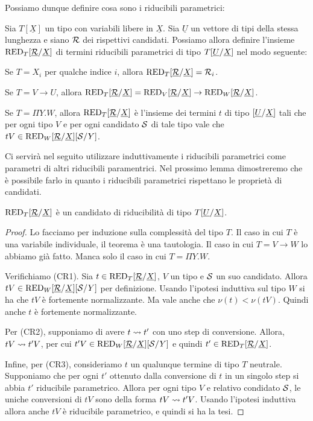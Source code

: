 \documentclass[]{marticle}
\begin{document}
Possiamo dunque definire cosa sono i riducibili parametrici:
\newcommand{\subrx}{\sub{\underline{\can{R}}}{\underline{X}}}
\begin{block} [Definizione]
    Sia $T[\underline{X}]$ un tipo con variabili libere in $\underline{X}$. Sia
    $\underline{U}$ un vettore di tipi della stessa lunghezza e siano $\mathcal{R}$
    dei rispettivi candidati. Possiamo allora definire l'insieme
    $\red{T}\subrx$ di termini riducibili parametrici di tipo
    $T[\underline{U}/\underline{X}]$ nel modo seguente:
    \begin{nlist} [1]
        \item  Se $T=X_i$ per qualche indice $i$, allora
            $\red{T}\subrx=\can{R}_i$.
        \item Se $T=V\rightarrow U$, allora $\red{T}\subrx = \red{V}\subrx
            \rightarrow \red{W}\subrx$.
        \item Se $T=\Pi Y.W$, allora $\red{T}\subrx$ \`e l'insieme dei termini
            $t$ di tipo $[\underline{U}/\underline{X}]$ tali che per ogni
            tipo $V$ e per ogni candidato $\mathcal{S}$ di tale tipo vale che $tV
            \in \red{W}\subrx\sub{\can{S}}{Y}$.
    \end{nlist}
\end{block}

Ci servir\`a nel seguito utilizzare induttivamente i riducibili parametrici come
parametri di altri riducibili paramentrici. Nel prossimo lemma dimostreremo che
\`e possibile farlo in quanto i riducibili parametrici rispettano le propriet\`a
di candidati.
\begin{block} [Lemma]
    $\red{T}\subrx$ \`e un candidato di riducibilit\`a di tipo
    $T[\underline{U}/\underline{X}]$.
\end{block}
\begin{proof}
    Lo facciamo per induzione sulla complessit\`a del tipo $T$. Il caso in cui
    $T$ \`e una variabile individuale, il teorema \`e una tautologia. Il caso in
    cui $T=V\rightarrow W$ lo abbiamo gi\`a fatto. Manca solo il caso in cui
    $T=\Pi Y.W$. 

    Verifichiamo (CR1). Sia $t\in \red{T}\subrx$, $V$ un tipo e $\mathcal{S}$ un suo
    candidato. Allora $tV \in \red{W}\subrx\sub{\can{S}}{Y}$ per definizione.
    Usando l'ipotesi induttiva sul tipo $W$ si ha che $tV$ \`e fortemente
    normalizzante. Ma vale anche che $\nu(t)<\nu(tV)$. Quindi anche $t$ \`e
    fortemente normalizzante. 

    Per (CR2), supponiamo di avere $t\rightsquigarrow t'$ con uno step di conversione.
    Allora, $tV\rightsquigarrow t'V$, per cui $t'V \in \red{W}\subrx\sub{\can{S}}{Y}$ e
    quindi $t'\in \red{T}\subrx$.

    Infine, per (CR3), consideriamo $t$ un qualunque termine di tipo $T$
    neutrale. Supponiamo che per ogni $t'$ ottenuto dalla conversione di $t$ in
    un singolo step si abbia $t'$ riducibile parametrico. Allora per ogni tipo
    $V$ e relativo condidato $\mathcal{S}$, le uniche conversioni di $tV$ sono della
    forma $tV\rightsquigarrow t'V$. Usando l'ipotesi induttiva allora anche $tV$ \`e
    riducibile parametrico, e quindi si ha la tesi.
\end{proof}
\end{document}
